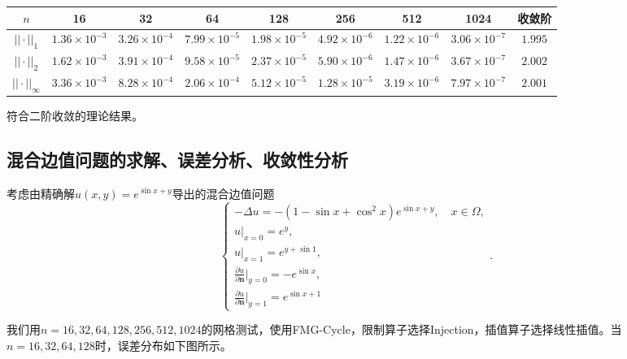 \documentclass[lang=cn,10pt]{elegantbook}
\begin{document}
\begin{table}[H]
  \centering
  \small
  \begin{tabular}{c|ccccccc|c}
  \textbf{$n$}        & 16                   & 32                   & 64                   & 128                  & 256                  & 512                  & 1024                  & 收敛阶 \\ \hline
  $||\cdot||_1$      & $1.36\times 10^{-3}$ & $3.26\times 10^{-4}$ & $7.99\times 10^{-5}$ & $1.98\times 10^{-5}$ & $4.92\times 10^{-6}$ & $1.22\times 10^{-6}$ & $3.06\times 10^{-7}$ & $1.995$\\
  $||\cdot||_2$      & $1.62\times 10^{-3}$ & $3.91\times 10^{-4}$ & $9.58\times 10^{-5}$ & $2.37\times 10^{-5}$ & $5.90\times 10^{-6}$ & $1.47\times 10^{-6}$ & $3.67\times 10^{-7}$ & $2.002$\\
  $||\cdot||_\infty$ & $3.36\times 10^{-3}$ & $8.28\times 10^{-4}$ & $2.06\times 10^{-4}$ & $5.12\times 10^{-5}$ & $1.28\times 10^{-5}$ & $3.19\times 10^{-6}$ & $7.97\times 10^{-7}$ & $2.001$
  \end{tabular}
\end{table}

符合二阶收敛的理论结果。

\subsection{混合边值问题的求解、误差分析、收敛性分析}

考虑由精确解$u(x,y)=e^{\sin x+y}$导出的混合边值问题
\begin{equation}
  \left\{
    \begin{array}{l}
      -\Delta u = -(1-\sin x+\cos^2 x)e^{\sin x + y},\quad x\in\Omega, \\
      u|_{x=0}=e^{y},\\
      u|_{x=1}=e^{y+\sin 1},\\
      \frac{\partial u}{\partial \mathbf{n}}|_{y=0}=-e^{\sin x},\\
      \frac{\partial u}{\partial \mathbf{n}}|_{y=1}=e^{\sin x+1}
    \end{array}
  \right. .
\end{equation}

我们用$n=16,32,64,128,256,512,1024$的网格测试，使用FMG-Cycle，限制算子选择Injection，插值算子选择线性插值。当$n=16,32,64,128$时，误差分布如下图所示。
\end{document}
